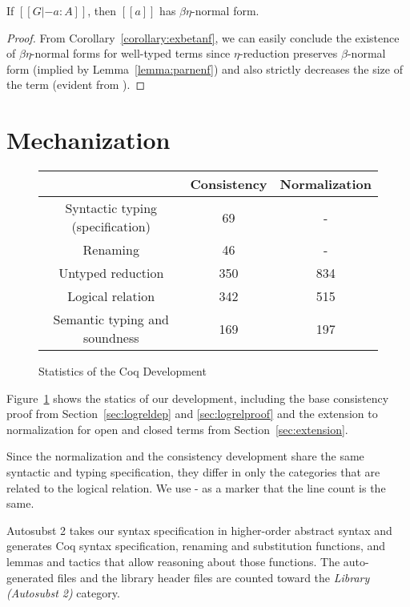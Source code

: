\documentclass[acmsmall,screen=true,
\ifpublic review=false\else,review=true\fi
  ,anonymous=\ifanonymous true\else false\fi]{acmart}
\begin{document}
\begin{corollary}
\label{corollary:exbetaeta}
If $[[G |- a : A]]$, then $[[a]]$ has $\beta\eta$-normal form.
\end{corollary}
\begin{proof}
  From Corollary~\ref{corollary:exbetanf}, we can easily conclude the
  existence of $\beta\eta$-normal forms for well-typed terms since
  $\eta$-reduction preserves $\beta$-normal form (implied by
  Lemma~\ref{lemma:parnenf}) and also strictly decreases the size of
  the term (evident from ).
\end{proof}




\section{Mechanization}
\label{sec:logrelmech}
\begin{figure}[h]
  \begin{tabular}{ c |  c  | c  }
    & Consistency & Normalization \\
    \hline
    Syntactic typing (specification) &  69 & - \\
    Renaming & 46 & -  \\
    Untyped reduction & 350 & 834 \\
    Logical relation & 342 & 515 \\
    Semantic typing and soundness & 169 & 197 \\
  \end{tabular}
  \caption{Statistics of the Coq Development}
  \label{fig:linecount}
\end{figure}

Figure~\ref{fig:linecount} shows the statics of our
development, including the base consistency proof from
Section~\ref{sec:logreldep} and \ref{sec:logrelproof} and the
extension to normalization for open and closed terms from
Section~\ref{sec:extension}.

Since the normalization and the consistency development share the same
syntactic and typing specification, they differ in only the categories
that are related to the logical relation. We use - as a marker that
the line count is the same.

Autosubst 2 takes our syntax specification in higher-order abstract
syntax and generates Coq syntax specification, renaming and
substitution functions, and lemmas and tactics that allow reasoning
about those functions. The auto-generated files and the library header
files are counted toward the \emph{Library (Autosubst 2)} category.
\end{document}
